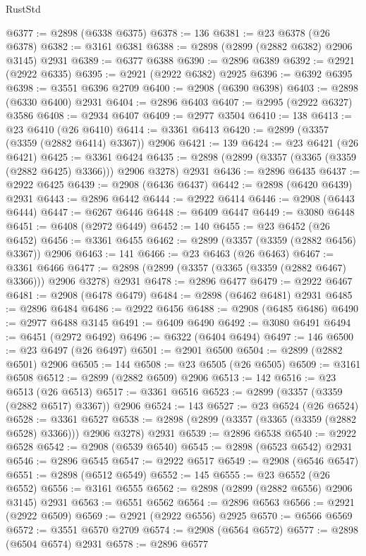 \begin{lexlean}{RustStd}
\begin{coremodule}
@6377 := @2898 (@6338 @6375)
@6378 := 136
@6381 := @23 @6378 (@26 @6378)
@6382 := @3161 @6381
@6388 := @2898 (@2899 (@2882 @6382) @2906 @3145) @2931
@6389 := @6377 @6388
@6390 := @2896 @6389
@6392 := @2921 (@2922 @6335)
@6395 := @2921 (@2922 @6382) @2925
@6396 := @6392 @6395
@6398 := @3551 @6396 @2709
@6400 := @2908 (@6390 @6398)
@6403 := @2898 (@6330 @6400) @2931
@6404 := @2896 @6403
@6407 := @2995 (@2922 @6327) @3586
@6408 := @2934 @6407
@6409 := @2977 @3504
@6410 := 138
@6413 := @23 @6410 (@26 @6410)
@6414 := @3361 @6413
@6420 := @2899 (@3357 (@3359 (@2882 @6414) @3367)) @2906
@6421 := 139
@6424 := @23 @6421 (@26 @6421)
@6425 := @3361 @6424
@6435 := @2898 (@2899 (@3357 (@3365 (@3359 (@2882 @6425) @3366))) @2906 @3278) @2931
@6436 := @2896 @6435
@6437 := @2922 @6425
@6439 := @2908 (@6436 @6437)
@6442 := @2898 (@6420 @6439) @2931
@6443 := @2896 @6442
@6444 := @2922 @6414
@6446 := @2908 (@6443 @6444)
@6447 := @6267 @6446
@6448 := @6409 @6447
@6449 := @3080 @6448
@6451 := @6408 (@2972 @6449)
@6452 := 140
@6455 := @23 @6452 (@26 @6452)
@6456 := @3361 @6455
@6462 := @2899 (@3357 (@3359 (@2882 @6456) @3367)) @2906
@6463 := 141
@6466 := @23 @6463 (@26 @6463)
@6467 := @3361 @6466
@6477 := @2898 (@2899 (@3357 (@3365 (@3359 (@2882 @6467) @3366))) @2906 @3278) @2931
@6478 := @2896 @6477
@6479 := @2922 @6467
@6481 := @2908 (@6478 @6479)
@6484 := @2898 (@6462 @6481) @2931
@6485 := @2896 @6484
@6486 := @2922 @6456
@6488 := @2908 (@6485 @6486)
@6490 := @2977 @6488 @3145
@6491 := @6409 @6490
@6492 := @3080 @6491
@6494 := @6451 (@2972 @6492)
@6496 := @6322 (@6404 @6494)
@6497 := 146
@6500 := @23 @6497 (@26 @6497)
@6501 := @2901 @6500
@6504 := @2899 (@2882 @6501) @2906
@6505 := 144
@6508 := @23 @6505 (@26 @6505)
@6509 := @3161 @6508
@6512 := @2899 (@2882 @6509) @2906
@6513 := 142
@6516 := @23 @6513 (@26 @6513)
@6517 := @3361 @6516
@6523 := @2899 (@3357 (@3359 (@2882 @6517) @3367)) @2906
@6524 := 143
@6527 := @23 @6524 (@26 @6524)
@6528 := @3361 @6527
@6538 := @2898 (@2899 (@3357 (@3365 (@3359 (@2882 @6528) @3366))) @2906 @3278) @2931
@6539 := @2896 @6538
@6540 := @2922 @6528
@6542 := @2908 (@6539 @6540)
@6545 := @2898 (@6523 @6542) @2931
@6546 := @2896 @6545
@6547 := @2922 @6517
@6549 := @2908 (@6546 @6547)
@6551 := @2898 (@6512 @6549)
@6552 := 145
@6555 := @23 @6552 (@26 @6552)
@6556 := @3161 @6555
@6562 := @2898 (@2899 (@2882 @6556) @2906 @3145) @2931
@6563 := @6551 @6562
@6564 := @2896 @6563
@6566 := @2921 (@2922 @6509)
@6569 := @2921 (@2922 @6556) @2925
@6570 := @6566 @6569
@6572 := @3551 @6570 @2709
@6574 := @2908 (@6564 @6572)
@6577 := @2898 (@6504 @6574) @2931
@6578 := @2896 @6577

\end{coremodule}
\end{lexlean}
